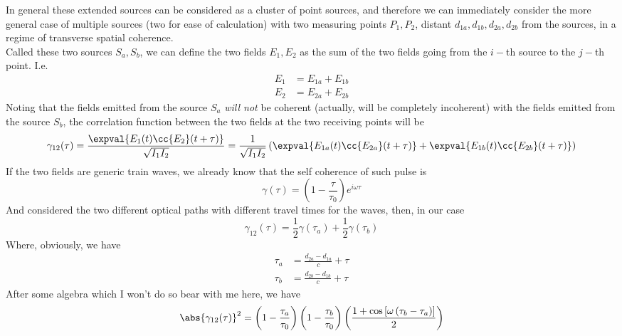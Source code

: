 \documentclass[../electromagnetism.tex]{subfiles}
\begin{document}
In general these extended sources can be considered as a cluster of point sources, and therefore we can immediately consider the more general case of multiple sources (two for ease of calculation) with two measuring points $P_1,P_2$, distant $d_{1a},d_{1b},d_{2a},d_{2b}$ from the sources, in a regime of transverse spatial coherence.\\
Called these two sources $S_a,S_b$, we can define the two fields $E_1,E_2$ as the sum of the two fields going from the $i-$th source to the $j-$th point. I.e.
\begin{equation}
	\begin{aligned}
		E_1&= E_{1a}+E_{1b}\\
		E_2&= E_{2a}+E_{2b}
	\end{aligned}
	\label{eq:e1e2spatialcoherence}
\end{equation}
Noting that the fields emitted from the source $S_a$ \textit{will not} be coherent (actually, will be completely incoherent) with the fields emitted from the source $S_b$, the correlation function between the two fields at the two receiving points will be
\begin{equation}
	\gamma_{12}(\tau)=\frac{\expval{E_1(t)\cc{E_2}(t+\tau)}}{\sqrt{I_1I_2}}=\frac{1}{\sqrt{I_1I_2}}\left( \expval{E_{1a}(t)\cc{E_{2a}}(t+\tau)}+\expval{E_{1b}(t)\cc{E_{2b}}(t+\tau)} \right)
\end{equation}
If the two fields are generic train waves, we already know that the self coherence of such pulse is
\begin{equation*}
	\gamma(\tau)=\left( 1-\frac{\tau}{\tau_0} \right)e^{i\omega\tau}
\end{equation*}
And considered the two different optical paths with different travel times for the waves, then, in our case
\begin{equation*}
	\gamma_{12}(\tau)=\frac{1}{2}\gamma(\tau_a)+\frac{1}{2}\gamma(\tau_b)
\end{equation*}
Where, obviously, we have
\begin{equation*}
	\begin{aligned}
		\tau_a&= \frac{d_{2a}-d_{1a}}{c}+\tau\\
		\tau_b&= \frac{d_{2b}-d_{1b}}{c}+\tau
	\end{aligned}
\end{equation*}
After some algebra which I won't do so bear with me here, we have
\begin{equation}
	\abs{\gamma_{12}(\tau)}^2=\left( 1-\frac{\tau_a}{\tau_0} \right)\left( 1-\frac{\tau_b}{\tau_0} \right)\left( \frac{1+\cos\left[ \omega\left( \tau_b-\tau_a \right) \right]}{2} \right)
	\label{eq:absvalautocorrspatcoh}
\end{equation}
\end{document}
